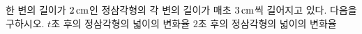 한 변의 길이가 $2\mkern3mu \mathrm{cm}$인 정삼각형의 각 변의 길이가 매초 $3\mkern3mu \mathrm{cm}$씩 길어지고 있다. 다음을 구하시오.
 $t$초 후의 정삼각형의 넓이의 변화율
 $2$초 후의 정삼각형의 넓이의 변화율
